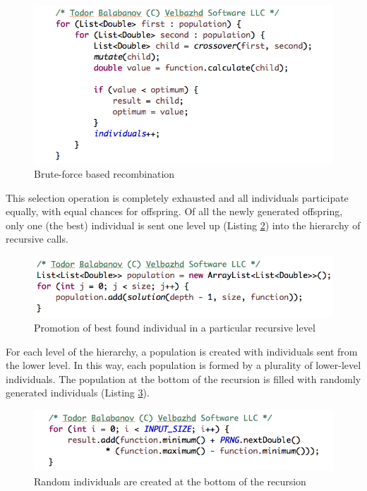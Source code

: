 \documentclass[graybox]{styles/svmult}
\begin{document}
\begin{figure}[b]
\sidecaption
\includegraphics[width=1.0\textwidth]{images/fig09}
\caption{Brute-force based recombination}
\label{fig:1}
\end{figure}

This selection operation is completely exhausted and all individuals participate equally, with equal chances for offspring. Of all the newly generated offspring, only one (the best) individual is sent one level up (Listing \ref{fig:2}) into the hierarchy of recursive calls.

\begin{figure}[b]
\sidecaption
\includegraphics[width=1.0\textwidth]{images/fig10}
\caption{Promotion of best found individual in a particular recursive level}
\label{fig:2}
\end{figure}

For each level of the hierarchy, a population is created with individuals sent from the lower level. In this way, each population is formed by a plurality of lower-level individuals. The population at the bottom of the recursion is filled with randomly generated individuals (Listing \ref{fig:3}).

\begin{figure}[b]
\sidecaption
\includegraphics[width=1.0\textwidth]{images/fig11}
\caption{Random individuals are created at the bottom of the recursion}
\label{fig:3}
\end{figure}
\end{document}
